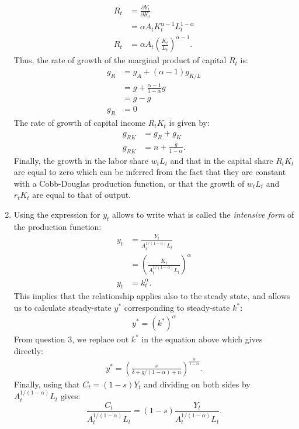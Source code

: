 \documentclass[]{book}
\begin{document}
\begin{enumerate}
\[  \begin{aligned}
  R_t&=\frac{\partial Y_t}{\partial K_t}\\
  &=\alpha A_t K_t^{\alpha-1}L_t^{1-\alpha}\\
  R_t&= \alpha A_t \left(\frac{K_t}{L_t}\right)^{\alpha-1}.
  \end{aligned}
  \] Thus, the rate of growth of the marginal product of capital \(R_t\)
  is: \[
  \begin{aligned}
  g_R&=g_A+(\alpha-1) g_{K/L}\\
  &=g +\frac{\alpha-1}{1-\alpha}g\\
  &=g-g\\
  g_R&=0
  \end{aligned}
  \] The rate of growth of capital income \(R_t K_t\) is given by: \[
  \begin{aligned}
  g_{R K}&=g_R + g_K \\
  g_{R K}&= n + \frac{g}{1-\alpha}.
  \end{aligned}
  \] Finally, the growth in the labor share \(w_t L_t\) and that in the
  capital share \(R_t K_t\) are equal to zero which can be inferred from
  the fact that they are constant with a Cobb-Douglas production
  function, or that the growth of \(w_t L_t\) and \(r_t K_t\) are equal
  to that of output.
\item
  Using the expression for \(y_t\) allows to write what is called the
  \emph{intensive form} of the production function: \[
  \begin{aligned}
  y_t&=\frac{Y_t}{A_t^{1/(1-\alpha)} L_t}\\
  &= \left(\frac{K_t}{A_t^{1/(1-\alpha)}L_t}\right)^\alpha\\
  y_t&= k_t^\alpha.
  \end{aligned}
  \] This implies that the relationship applies also to the steady
  state, and allows us to calculate steady-state \(y^{*}\) corresponding
  to steady-state \(k^{*}\): \[
  \begin{aligned}
  y^*=\left(k^*\right)^\alpha
  \end{aligned}
  \] From question 3, we replace out \(k^{*}\) in the equation above
  which gives directly: \[
  \begin{aligned}
  \boxed{y^{*}=\left(\frac{s}{\delta+g/(1-\alpha)+n}\right)^{\frac{\alpha}{1-\alpha}}}.
  \end{aligned}
  \] Finally, using that \(C_t = (1-s)Y_t\) and dividing on both sides
  by \(A_t^{1/(1-\alpha)} L_t\) gives:
  \[\frac{C_t}{A_t^{1/(1-\alpha)} L_t}=(1-s)\frac{Y_t}{A_t^{1/(1-\alpha)} L_t}.\]

\end{enumerate}
\end{document}
